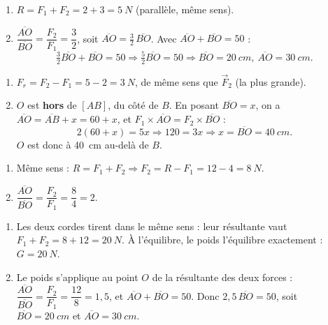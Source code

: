 \documentclass[11pt,a4paper]{article}
\newcommand{\vv}[1]{\vec{#1}}\newcommand{\ds}{\displaystyle}
\begin{document}
\begin{corrige}
\begin{enumerate}[label=\alph*)]
  \item $R = F_1+F_2 = 2+3 = \qty{5}{N}$ (parallèle, même sens).
  \item $\dfrac{\overline{AO}}{\overline{BO}}=\dfrac{F_2}{F_1}=\dfrac{3}{2}$, soit
        $\overline{AO}=\tfrac{3}{2}\,\overline{BO}$. Avec $\overline{AO}+\overline{BO}=50$ :
        \[ \tfrac{3}{2}\overline{BO}+\overline{BO}=50 \Rightarrow \tfrac{5}{2}\overline{BO}=50
        \Rightarrow \overline{BO}=\qty{20}{cm},\ \overline{AO}=\qty{30}{cm}. \]
\end{enumerate}
\end{corrige}

\begin{corrige}
\begin{enumerate}[label=\alph*)]
  \item $F_r = F_2 - F_1 = 5 - 2 = \qty{3}{N}$, de même sens que $\vv F_2$ (la plus grande).
  \item $O$ est \textbf{hors} de $[AB]$, du côté de $B$. En posant $\overline{BO}=x$, on a
        $\overline{AO}=\overline{AB}+x=60+x$, et $F_1\times\overline{AO}=F_2\times\overline{BO}$ :
        \[ 2(60+x)=5x \Rightarrow 120=3x \Rightarrow x=\overline{BO}=\qty{40}{cm}. \]
        $O$ est donc à \qty{40}{cm} au-delà de $B$.
\end{enumerate}
\end{corrige}

\begin{corrige}
\begin{enumerate}[label=\alph*)]
  \item Même sens : $R=F_1+F_2 \Rightarrow F_2 = R-F_1 = 12-4 = \qty{8}{N}$.
  \item $\dfrac{\overline{AO}}{\overline{BO}}=\dfrac{F_2}{F_1}=\dfrac{8}{4}=2$.
\end{enumerate}
\end{corrige}

\begin{corrige}
\begin{enumerate}[label=\alph*)]
  \item Les deux cordes tirent dans le même sens : leur résultante vaut $F_1+F_2=8+12=\qty{20}{N}$.
        À l'équilibre, le poids l'équilibre exactement : $G=\qty{20}{N}$.
  \item Le poids s'applique au point $O$ de la résultante des deux forces :
        $\dfrac{\overline{AO}}{\overline{BO}}=\dfrac{F_2}{F_1}=\dfrac{12}{8}=1{,}5$, et
        $\overline{AO}+\overline{BO}=50$. Donc $2{,}5\,\overline{BO}=50$, soit
        $\overline{BO}=\qty{20}{cm}$ et $\overline{AO}=\qty{30}{cm}$.
\end{enumerate}
\end{corrige}
\end{document}

